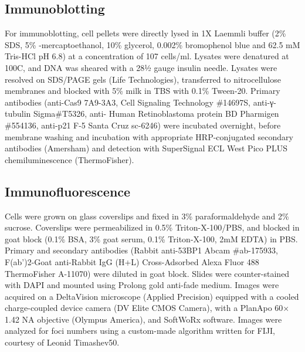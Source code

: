 \documentclass[phd,tocprelim]{cornell}
\begin{document}
\subsection*{Immunoblotting}
For immunoblotting, cell pellets were directly lysed in 1X Laemmli buffer (2\% SDS, 5\% \textbeta-mercaptoethanol, 10\% glycerol, 0.002\% bromophenol blue and 62.5 mM Tris-HCl pH 6.8) at a concentration of 107 cells/ml. Lysates were denatured at 100\textdegree C, and DNA was sheared with a 28½ gauge insulin needle. Lysates were resolved on SDS/PAGE gels (Life Technologies), transferred to nitrocellulose membranes and blocked with 5\% milk in TBS with 0.1\% Tween-20. Primary antibodies (anti-Cas9 7A9-3A3, Cell Signaling Technology \#14697S, anti-γ-tubulin Sigma\#T5326, anti- Human Retinoblastoma protein BD Pharmigen \#554136, anti-p21 F-5 Santa Cruz sc-6246) were incubated overnight, before membrane washing and incubation with appropriate HRP-conjugated secondary antibodies (Amersham) and detection with SuperSignal ECL West Pico PLUS chemiluminescence (ThermoFisher).

\subsection*{Immunofluorescence}
Cells were grown on glass coverslips and fixed in 3\% paraformaldehyde and 2\% sucrose. Coverslips were permeabilized in 0.5\% Triton-X-100/PBS, and blocked in goat block (0.1\% BSA, 3\% goat serum, 0.1\% Triton-X-100, 2mM EDTA) in PBS. Primary and secondary antibodies (Rabbit anti-53BP1 Abcam \#ab-175933, F(ab')2-Goat anti-Rabbit IgG (H+L) Cross-Adsorbed Alexa Fluor 488 ThermoFisher A-11070) were diluted in goat block. Slides were counter-stained with DAPI and mounted using Prolong gold anti-fade medium. Images were acquired on a DeltaVision microscope (Applied Precision) equipped with a cooled charge-coupled device camera (DV Elite CMOS Camera), with a PlanApo 60× 1.42 NA objective (Olympus America), and SoftWoRx software. Images were analyzed for foci numbers using a custom-made algorithm written for FIJI, courtesy of Leonid Timashev50.
\end{document}
